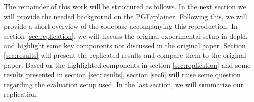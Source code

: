 \documentclass{article}
\begin{document}

The remainder of this work will be structured as follows. In the next section we will provide the needed background on the PGExplainer. Following this, we will provide a short overview of the codebase accompanying this reproduction. In section \ref{sec:replication}, we will discuss the original experimental setup in depth and highlight some key components not discussed in the original paper. Section \ref{sec:results} will present the replicated results and compare them to the original paper. Based on the highlighted components in section \ref{sec:replication} and some results presented in section \ref{sec:results}, section \ref{sec6} will raise some question regarding the evaluation setup used. In the last section, we will summarize our replication. 








\end{document}
